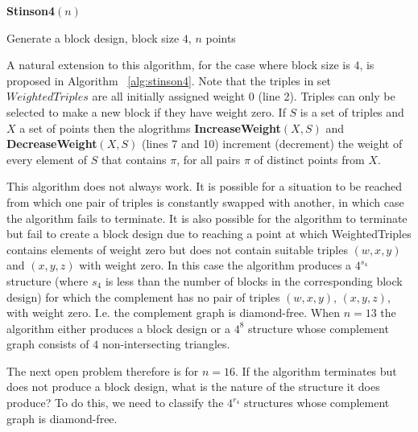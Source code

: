 \documentclass{l4proj}
\begin{document}
\begin{algorithm}
\DontPrintSemicolon
\textbf{Stinson4}$(n)$\;
\nl {}
\caption{Generate a block design, block size $4$, $n$ points}\label{alg:stinson4}
\end{algorithm}



A natural extension to this algorithm, for the case where block size
is $4$, is proposed in Algorithm ~\ref{alg:stinson4}. Note that the triples in set $WeightedTriples$ are all initially assigned 
weight $0$ (line 2). Triples can only be selected to make a new block if they have weight zero. If $S$ is a set of 
triples and $X$ a set of points then the alogrithms {\bf IncreaseWeight}$(X,S)$ and {\bf DecreaseWeight}$(X,S)$ (lines 7 and 10)
increment (decrement) the weight of every element of $S$ that contains $\pi$, for all pairs $\pi$ of distinct points from $X$.

This algorithm does not always work.  It is possible for  a situation to be reached from which one pair of  triples 
is constantly swapped with another, in which case the algorithm fails to terminate. It is also possible for the algorithm to 
terminate but  fail to create a block design due to reaching a point at which WeightedTriples contains elements of weight zero but
does not contain suitable triples $(w,x,y)$
and $(x,y,z)$ with weight zero. In this case the algorithm produces a $4^{s_{4}}$ structure (where $s_{4}$ is less than the number of blocks in the 
corresponding block design) for which the complement has no pair of triples $(w,x,y)$, $(x,y,z)$, with weight zero.
I.e. the complement graph is diamond-free.
When $n=13$ the algorithm either produces a block design or a $4^{8}$
structure whose complement graph consists of  $4$ non-intersecting
triangles.

The next open problem therefore is for $n=16$. If the algorithm terminates but does
not produce a block design, what is the nature of the structure it
does produce? To do this, we need to classify the $4^{r_{4}}$
structures whose complement graph is diamond-free.
\end{document}
